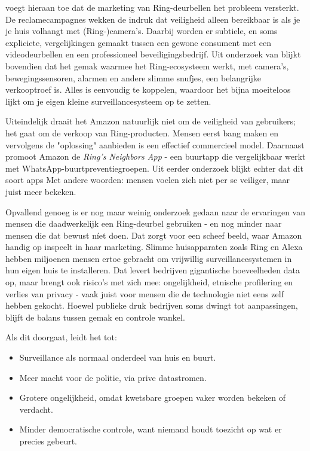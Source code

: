\documentclass[nonacm, sigconf, balance=true]{acmart}
\begin{document}
    \noindent \parencite{kelly2023ring} voegt hieraan toe dat de marketing van Ring-deurbellen het probleem versterkt.
    De reclamecampagnes wekken de indruk dat veiligheid alleen bereikbaar is als je je huis volhangt met (Ring-)camera's.
    Daarbij worden er subtiele, en soms expliciete, vergelijkingen gemaakt tussen een gewone consument met een videodeurbellen en een professioneel beveiligingsbedrijf.
    Uit onderzoek van \citeauthor{kelly2023ring} blijkt bovendien dat het gemak waarmee het Ring-ecosysteem werkt, met camera's, bewegingssensoren, alarmen en andere slimme snufjes, een belangrijke verkooptroef is.
    Alles is eenvoudig te koppelen, waardoor het bijna moeiteloos lijkt om je eigen kleine surveillancesysteem op te zetten.

    \noindent Uiteindelijk draait het Amazon natuurlijk niet om de veiligheid van gebruikers; het gaat om de verkoop van Ring-producten.
    Mensen eerst bang maken en vervolgens de "oplossing" aanbieden is een effectief commercieel model.
    Daarnaast promoot Amazon de \textit{Ring's Neighbors App} - een buurtapp die vergelijkbaar werkt met WhatsApp-buurtpreventiegroepen.
    Uit eerder onderzoek blijkt echter dat dit soort apps
    Met andere woorden: mensen voelen zich niet per se veiliger, maar juist meer bekeken.

    \noindent Opvallend genoeg is er nog maar weinig onderzoek gedaan naar de ervaringen van mensen die daadwerkelijk een Ring-deurbel gebruiken - en nog minder naar mensen die dat bewust níet doen.
    Dat zorgt voor een scheef beeld, waar Amazon handig op inspeelt in haar marketing.
    Slimme huisapparaten zoals Ring en Alexa hebben miljoenen mensen ertoe gebracht om vrijwillig surveillancesystemen in hun eigen huis te installeren.
    Dat levert bedrijven gigantische hoeveelheden data op, maar brengt ook risico's met zich mee: ongelijkheid, etnische profilering en verlies van privacy - vaak juist voor mensen die de technologie niet eens zelf hebben gekocht.
    Hoewel publieke druk bedrijven soms dwingt tot aanpassingen, blijft de balans tussen gemak en controle wankel.

    \noindent Als dit doorgaat, leidt het tot:
    \begin{itemize}
        \item Surveillance als normaal onderdeel van huis en buurt.
        \item Meer macht voor de politie, via prive datastromen.
        \item Grotere ongelijkheid, omdat kwetsbare groepen vaker worden bekeken of verdacht.
        \item Minder democratische controle, want niemand houdt toezicht op wat er precies gebeurt.
    \end{itemize}
\end{document}
